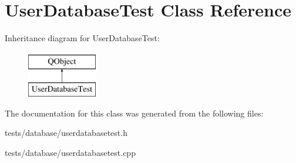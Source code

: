 \hypertarget{classUserDatabaseTest}{}\section{User\+Database\+Test Class Reference}
\label{classUserDatabaseTest}
Inheritance diagram for User\+Database\+Test\+:\begin{figure}[H]
\begin{center}
\leavevmode
\includegraphics[height=2.000000cm]{d7/dc1/classUserDatabaseTest}
\end{center}
\end{figure}


The documentation for this class was generated from the following files\+:\begin{DoxyCompactItemize}
\item 
tests/database/userdatabasetest.\+h\item 
tests/database/userdatabasetest.\+cpp\end{DoxyCompactItemize}
